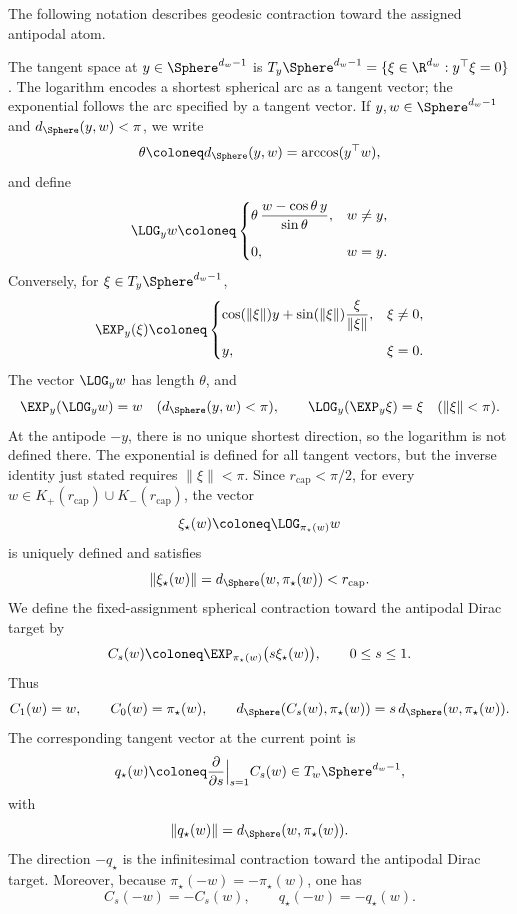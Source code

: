 The following notation describes geodesic contraction toward the assigned antipodal atom.
\begin{definition}
    \label{definition-spherical-logarithm-exponential}
The tangent space at \(y\in\Sphere^{d_w-1}\) is
\(T_y\Sphere^{d_w-1}=\{\xi\in\R^{d_w}:y^\top\xi=0\}\).
The logarithm encodes a shortest spherical arc as a tangent vector; the
exponential follows the arc specified by a tangent vector. If
\(y,w\in\Sphere^{d_w-1}\) and \(d_\Sphere(y,w)<\pi\), we write
\[
    \theta\coloneq d_\Sphere(y,w)=\arccos(y^\top w),
\]
and define
\begin{equation}
\label{eq:mf-spherical-LOG}
    \LOG_y w
    \coloneq
    \begin{cases}
    \displaystyle
    \theta\,
    \frac{w-\cos\theta\,y}{\sin\theta},
    & w\neq y,\\[1.2em]
    0, & w=y.
    \end{cases}
\end{equation}
Conversely, for \(\xi\in T_y\Sphere^{d_w-1}\),
\begin{equation}
\label{eq:mf-spherical-EXP}
    \EXP_y(\xi)
    \coloneq
    \begin{cases}
    \displaystyle
    \cos(\|\xi\|)y+
    \sin(\|\xi\|)\frac{\xi}{\|\xi\|},
    & \xi\neq0,\\[1.2em]
    y, & \xi=0.
    \end{cases}
\end{equation}
The vector \(\LOG_yw\) has length \(\theta\), and
\[
 \EXP_y(\LOG_yw)=w\quad(d_\Sphere(y,w)<\pi),\qquad
 \LOG_y(\EXP_y\xi)=\xi\quad(\|\xi\|<\pi).
\]
At the antipode \(-y\), there is no unique shortest direction, so the
logarithm is not defined there. The exponential is defined for all tangent
vectors, but the inverse identity just stated requires \(\|\xi\|<\pi\).
Since \(r_{\mathrm{cap}}<\pi/2\), for every
\(w\in K_+(r_{\mathrm{cap}})\cup K_-(r_{\mathrm{cap}})\), the vector
\[
    \xi_\star(w)
    \coloneq
    \LOG_{\pi_\star(w)}w
\]
is uniquely defined and satisfies
\[
    \|\xi_\star(w)\|
    =
    d_\Sphere(w,\pi_\star(w))
    <r_{\mathrm{cap}}.
\]
We define the fixed-assignment spherical contraction toward the antipodal Dirac target by
\[
    C_s(w)
    \coloneq
    \EXP_{\pi_\star(w)}\bigl(s\xi_\star(w)\bigr),
    \qquad
    0\le s\le1.
\]
Thus
\[
    C_1(w)=w,
    \qquad
    C_0(w)=\pi_\star(w),
    \qquad
    d_\Sphere(C_s(w),\pi_\star(w))
    =s\,d_\Sphere(w,\pi_\star(w)).
\]
The corresponding tangent vector at the current point is
\[
    q_\star(w)
    \coloneq
    \frac{\partial}{\partial s}\Big|_{s=1}C_s(w)
    \in T_w\Sphere^{d_w-1},
\]
with
\[
    \|q_\star(w)\|=d_\Sphere(w,\pi_\star(w)).
\]
The direction \(-q_\star\) is the infinitesimal contraction toward the antipodal Dirac target.
Moreover, because \(\pi_\star(-w)=-\pi_\star(w)\), one has
\[
    C_s(-w)=-C_s(w),
    \qquad
    q_\star(-w)=-q_\star(w).
\]
\end{definition}

